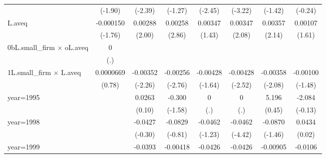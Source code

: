 \begin{table}[htbp]
\begin{tabular}{l*{7}{c}}
                    &     (-1.90)         &     (-2.39)         &     (-1.27)         &     (-2.45)         &     (-3.22)         &     (-1.42)         &     (-0.24)         \\
\addlinespace
L.aveq              &   -0.000150         &     0.00288\sym{*}  &     0.00258\sym{**} &     0.00347         &     0.00347\sym{*}  &     0.00357\sym{*}  &     0.00107         \\
                    &     (-1.76)         &      (2.00)         &      (2.86)         &      (1.43)         &      (2.08)         &      (2.14)         &      (1.61)         \\
\addlinespace
0bL.small\_firm $\times$ oL.aveq&           0         &                     &                     &                     &                     &                     &                     \\
                    &         (.)         &                     &                     &                     &                     &                     &                     \\
\addlinespace
1L.small\_firm $\times$ L.aveq&   0.0000669         &    -0.00352\sym{*}  &    -0.00256\sym{**} &    -0.00428         &    -0.00428\sym{*}  &    -0.00358\sym{*}  &    -0.00100         \\
                    &      (0.78)         &     (-2.26)         &     (-2.76)         &     (-1.64)         &     (-2.52)         &     (-2.08)         &     (-1.48)         \\
\addlinespace
year=1995           &                     &      0.0263         &      -0.300         &           0         &           0         &       5.196         &      -2.084         \\
                    &                     &      (0.10)         &     (-1.58)         &         (.)         &         (.)         &      (0.45)         &     (-0.13)         \\
\addlinespace
year=1998           &                     &     -0.0427         &     -0.0829         &     -0.0462         &     -0.0462\sym{***}&     -0.0870         &      0.0434         \\
                    &                     &     (-0.30)         &     (-0.81)         &     (-1.23)         &     (-4.42)         &     (-1.46)         &      (0.02)         \\
\addlinespace
year=1999           &                     &     -0.0393\sym{*}  &    -0.00418         &     -0.0426\sym{*}  &     -0.0426\sym{*}  &    -0.00905         &     -0.0106         \\

\end{tabular}
\end{table}
